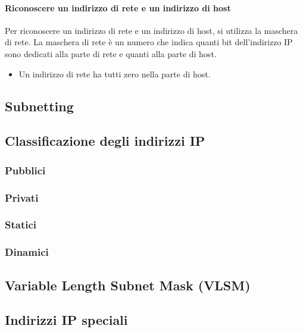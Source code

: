 \paragraph{Riconoscere un indirizzo di rete e un indirizzo di host}

Per riconoscere un indirizzo di rete e un indirizzo di host, si utilizza la maschera di rete. La maschera di rete è un numero che indica quanti bit dell'indirizzo IP sono dedicati alla parte di rete e quanti alla parte di host.

\begin{itemize}
    \item Un indirizzo di rete ha tutti zero nella parte di host.
\end{itemize}
\subsection{Subnetting}


\subsection{Classificazione degli indirizzi IP}

\subsubsection{Pubblici}
\subsubsection{Privati}

\subsubsection{Statici}
\subsubsection{Dinamici}


\subsection{Variable Length Subnet Mask (VLSM)}
\subsection{Indirizzi IP speciali}

